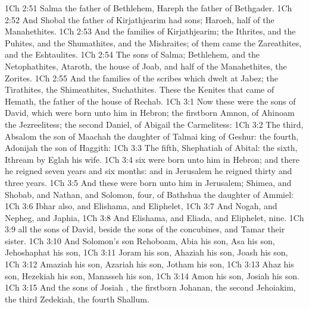 \vs 1Ch 2:51 Salma the father of Bethlehem, Hareph the father of Bethgader.
\vs 1Ch 2:52 And Shobal the father of Kirjathjearim had sons; Haroeh,  half of the Manahethites.
\vs 1Ch 2:53 And the families of Kirjathjearim; the Ithrites, and the Puhites, and the Shumathites, and the Mishraites; of them came the Zareathites, and the Eshtaulites.
\vs 1Ch 2:54 The sons of Salma; Bethlehem, and the Netophathites, Ataroth, the house of Joab, and half of the Manahethites, the Zorites.
\vs 1Ch 2:55 And the families of the scribes which dwelt at Jabez; the Tirathites, the Shimeathites,  Suchathites. These  the Kenites that came of Hemath, the father of the house of Rechab.
\vs 1Ch 3:1 Now these were the sons of David, which were born unto him in Hebron; the firstborn Amnon, of Ahinoam the Jezreelitess; the second Daniel, of Abigail the Carmelitess:
\vs 1Ch 3:2 The third, Absalom the son of Maachah the daughter of Talmai king of Geshur: the fourth, Adonijah the son of Haggith:
\vs 1Ch 3:3 The fifth, Shephatiah of Abital: the sixth, Ithream by Eglah his wife.
\vs 1Ch 3:4  six were born unto him in Hebron; and there he reigned seven years and six months: and in Jerusalem he reigned thirty and three years.
\vs 1Ch 3:5 And these were born unto him in Jerusalem; Shimea, and Shobab, and Nathan, and Solomon, four, of Bathshua the daughter of Ammiel:
\vs 1Ch 3:6 Ibhar also, and Elishama, and Eliphelet,
\vs 1Ch 3:7 And Nogah, and Nepheg, and Japhia,
\vs 1Ch 3:8 And Elishama, and Eliada, and Eliphelet, nine.
\vs 1Ch 3:9  all the sons of David, beside the sons of the concubines, and Tamar their sister.
\vs 1Ch 3:10 And Solomon's son  Rehoboam, Abia his son, Asa his son, Jehoshaphat his son,
\vs 1Ch 3:11 Joram his son, Ahaziah his son, Joash his son,
\vs 1Ch 3:12 Amaziah his son, Azariah his son, Jotham his son,
\vs 1Ch 3:13 Ahaz his son, Hezekiah his son, Manasseh his son,
\vs 1Ch 3:14 Amon his son, Josiah his son.
\vs 1Ch 3:15 And the sons of Josiah , the firstborn Johanan, the second Jehoiakim, the third Zedekiah, the fourth Shallum.
